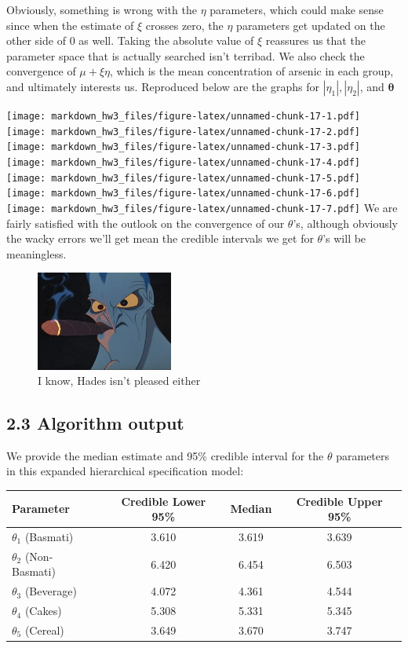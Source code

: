 \documentclass[]{article}
\begin{document}
Obviously, something is wrong with the \(\eta\) parameters, which could
make sense since when the estimate of \(\xi\) crosses zero, the \(\eta\)
parameters get updated on the other side of \(0\) as well. Taking the
absolute value of \(\xi\) reassures us that the parameter space that is
actually searched isn't terribad. We also check the convergence of
\(\mu + \xi\eta\), which is the mean concentration of arsenic in each
group, and ultimately interests us. Reproduced below are the graphs for
\(|\eta_1|, |\eta_2|\), and \(\boldsymbol{\theta}\)

\texttt{[image: markdown\_hw3\_files/figure-latex/unnamed-chunk-17-1.pdf]}
\texttt{[image: markdown\_hw3\_files/figure-latex/unnamed-chunk-17-2.pdf]}
\texttt{[image: markdown\_hw3\_files/figure-latex/unnamed-chunk-17-3.pdf]}
\texttt{[image: markdown\_hw3\_files/figure-latex/unnamed-chunk-17-4.pdf]}
\texttt{[image: markdown\_hw3\_files/figure-latex/unnamed-chunk-17-5.pdf]}
\texttt{[image: markdown\_hw3\_files/figure-latex/unnamed-chunk-17-6.pdf]}
\texttt{[image: markdown\_hw3\_files/figure-latex/unnamed-chunk-17-7.pdf]}
We are fairly satisfied with the outlook on the convergence of our
\(\theta\)'s, although obviously the wacky errors we'll get mean the
credible intervals we get for \(\theta\)'s will be meaningless.

\begin{figure}[h]
  \centering \includegraphics[width=0.4\textwidth]{hadeswrong}
  \caption{I know, Hades isn't pleased either}
\end{figure}\subsection{2.3 Algorithm output}

We provide the median estimate and 95\% credible interval for the
\(\theta\) parameters in this expanded hierarchical specification model:

\begin{center}
  \begin{tabular}{l c c c}
  \hline Parameter & Credible Lower 95\% & Median & Credible Upper 95\%  \\ \hline
    $\theta_1$ (Basmati) & 3.610 & 3.619 & 3.639 \\ 
    $\theta_2$ (Non-Basmati) & 6.420 & 6.454 & 6.503 \\
    $\theta_3$ (Beverage) & 4.072 & 4.361 & 4.544 \\
    $\theta_4$ (Cakes) & 5.308 & 5.331 & 5.345 \\
    $\theta_5$ (Cereal) & 3.649 & 3.670 & 3.747 \\ \hline
  \end{tabular}
\end{center}
\end{document}
